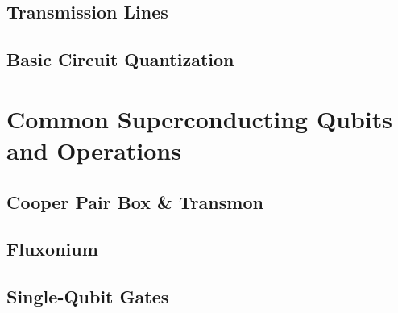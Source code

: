 \subsection{Transmission Lines}

\subsection{Basic Circuit Quantization}

\section{Common Superconducting Qubits and Operations}

\subsection{Cooper Pair Box \& Transmon}




 
\subsection{Fluxonium}


\subsection{Single-Qubit Gates}

